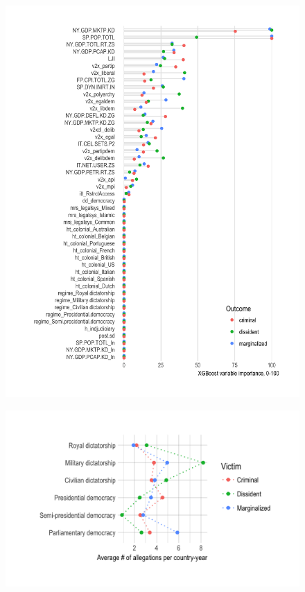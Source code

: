 \documentclass[12pt]{article}
\begin{document}
\begin{figure}
\begin{center}
\caption{}
\includegraphics[width=.99\textwidth]{../output/xgboost-variable-importance.png}
\end{center}
\end{figure}

\begin{figure}
\begin{center}
\caption{}
\includegraphics[width=.99\textwidth]{../output/avg-allegations-by-regime.png}
\end{center}
\end{figure}
\end{document}
